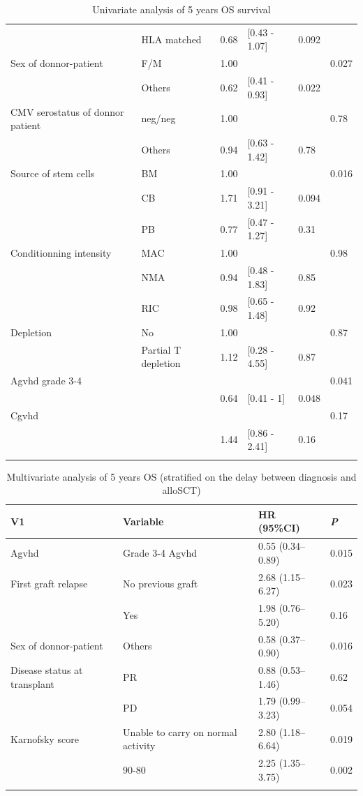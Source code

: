\documentclass[a4paper,11pt] {article}
\begin{document}
\begin{center}
\begin{landscape}
\begin{longtable}{llrlll}
   & HLA matched & 0.68 & [0.43 - 1.07] & 0.092 &  \\ 
  Sex of donnor-patient & F/M & 1.00 &  &  & 0.027 \\ 
   & Others & 0.62 & [0.41 - 0.93] & 0.022 &  \\ 
  CMV serostatus of donnor patient & neg/neg & 1.00 &  &  & 0.78 \\ 
   & Others & 0.94 & [0.63 - 1.42] & 0.78 &  \\ 
  Source of stem cells & BM & 1.00 &  &  & 0.016 \\ 
   & CB & 1.71 & [0.91 - 3.21] & 0.094 &  \\ 
   & PB & 0.77 & [0.47 - 1.27] & 0.31 &  \\ 
  Conditionning intensity & MAC & 1.00 &  &  & 0.98 \\ 
   & NMA & 0.94 & [0.48 - 1.83] & 0.85 &  \\ 
   & RIC & 0.98 & [0.65 - 1.48] & 0.92 &  \\ 
  Depletion & No & 1.00 &  &  & 0.87 \\ 
   & Partial T depletion & 1.12 & [0.28 - 4.55] & 0.87 &  \\ 
  Agvhd grade 3-4 &  &  &  &  & 0.041 \\ 
   &  & 0.64 & [0.41 - 1] & 0.048 &  \\ 
  Cgvhd &  &  &  &  & 0.17 \\ 
   &  & 1.44 & [0.86 - 2.41] & 0.16 &  \\ 
   \hline
\hline
\caption{Univariate analysis of 5 years OS survival} 
\label{tab:uos}
\end{longtable}


\begin{longtable}{llll}
  \hline
V1 & Variable & HR (95\%CI) & \emph{P} \\ 
  \hline
Agvhd & Grade 3-4 Agvhd & 0.55 (0.34--0.89) & 0.015 \\ 
  First graft relapse & No previous graft & 2.68 (1.15--6.27) & 0.023 \\ 
   & Yes & 1.98 (0.76--5.20) & 0.16 \\ 
  Sex of donnor-patient & Others & 0.58 (0.37--0.90) & 0.016 \\ 
  Disease status at transplant & PR & 0.88 (0.53--1.46) & 0.62 \\ 
   & PD & 1.79 (0.99--3.23) & 0.054 \\ 
  Karnofsky score & Unable to carry on normal activity & 2.80 (1.18--6.64) & 0.019 \\ 
   & 90-80 & 2.25 (1.35--3.75) & 0.002 \\ 
   \hline
\hline
\caption{Multivariate analysis of 5 years OS (stratified on the delay between diagnosis and alloSCT)} 
\label{tab:uos}
\end{longtable}\end{landscape}


\end{center}
\end{document}
